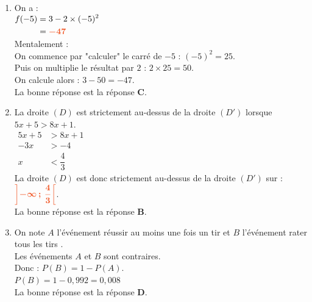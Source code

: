 \documentclass[a4paper,11pt]{article}
\begin{document}
{\begin{seanceD}{}
\begin{enumerate}
\item On a :\\
          $\begin{aligned}
          f(-5)&=3- 2\times (-5)^2\\
          &={\color[HTML]{F15929}\boldsymbol{-47}}
          \end{aligned}$\\{\color[HTML]{216D9A} Mentalement : \\
    On commence par "calculer" le carré de $-5$ :  $(-5)^2=25$.\\
    Puis on multiplie le résultat par $2$ : $2\times 25=50$.\\
    On calcule alors : $3-50=-47$.}\\La bonne réponse est la réponse {\bfseries \color[HTML]{F15929}C}.

\item La droite $(D)$ est strictement au-dessus de la droite $(D')$ lorsque $5x+5>8x+1$.\\
     $\begin{aligned}
     5x+5&>8x+1\\
     -3x&>-4\\
     x&<\dfrac{4}{3}
     \end{aligned}$\\
     La droite $(D)$ est donc strictement au-dessus de la droite $(D')$ sur : 
     ${\color[HTML]{F15929}\boldsymbol{\left]-\infty\,;\,\dfrac{4}{3}\right[}}$.\\La bonne réponse est la réponse {\bfseries \color[HTML]{F15929}B}.

\item On note $A$ l'événement \og{} réussir au moins une fois un tir \fg{} et $B$ l'événement \og{} rater tous les tirs \fg{}.\\
Les événements $A$ et $B$ sont contraires.\\
Donc : $P(B) = 1 - P(A)$.\\
$P(B) = 1 - 0{,}992 = 0{,}008$\\La bonne réponse est la réponse {\bfseries \color[HTML]{F15929}D}.

\end{enumerate}

\end{seanceD}
}{}
\end{document}
